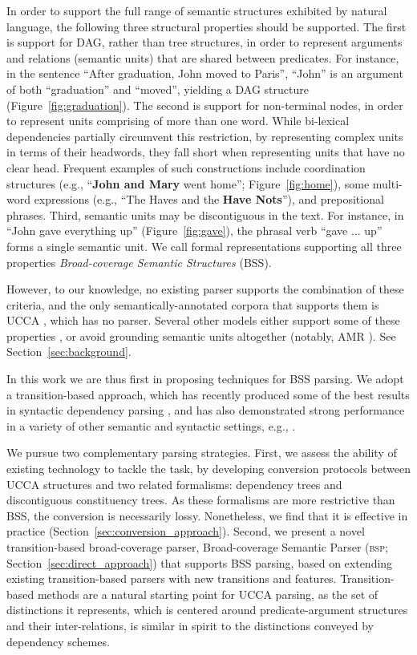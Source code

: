 \documentclass[11pt]{article}
\newcommand{\secref}[1]{Section~\ref{#1}}
\newcommand{\figref}[1]{Figure~\ref{#1}}
\begin{document}
In order to support the full range of semantic structures exhibited by
natural language, the following three structural properties should be supported.
The first is support for DAG, rather than tree structures,
in order to represent arguments and relations (semantic units)
that are shared between predicates.
For instance, in the sentence
``After graduation, John moved to Paris'', ``John'' is an argument of both ``graduation''
and ``moved'', yielding a DAG structure (\figref{fig:graduation}).
The second is support for non-terminal nodes, in order to represent units
comprising of more than one word.
While bi-lexical dependencies partially circumvent this restriction, by
representing complex units in terms of their headwords, they fall short
when representing units that have no clear head.
Frequent examples of such constructions include
coordination structures (e.g., ``{\bf John and Mary} went home''; \figref{fig:home}),
some multi-word expressions (e.g., ``The Haves and the {\bf Have Nots}''),
and prepositional phrases.
Third, semantic units may be discontiguous in the text. For instance, in ``John gave everything up''
(\figref{fig:gave}), the phrasal verb ``gave ... up'' forms a single semantic unit.
We call formal representations supporting all three properties
{\it Broad-coverage Semantic Structures} (BSS).

However, to our knowledge, no existing parser supports the combination of these criteria,
and the only semantically-annotated corpora that supports them is UCCA \cite{abend2013universal},
which has no parser.
Several other models either support some of these properties \cite{oepen2015semeval},
or avoid grounding semantic units altogether
(notably, AMR \cite{banarescu2013abstract}). See \secref{sec:background}.

In this work we are thus first in proposing techniques for BSS parsing.
We adopt a transition-based approach, which has recently produced some of the best
results in syntactic dependency parsing
\cite{dyer2015transition,ballesteros2015improved}, and has also demonstrated
strong performance in a variety of other semantic and syntactic settings,
e.g., .

We pursue two complementary parsing strategies.
First, we assess the ability of existing technology to tackle the task,
by developing conversion protocols between UCCA structures and two related formalisms:
dependency trees and discontiguous constituency trees.
As these formalisms are more restrictive than BSS, the conversion
is necessarily lossy. Nonetheless, we find that it is effective
in practice (\secref{sec:conversion_approach}).
Second, we present a novel transition-based broad-coverage parser,
Broad-coverage Semantic Parser (\textsc{bsp}; \secref{sec:direct_approach})
that supports BSS parsing, based on extending existing transition-based parsers
with new transitions and features. %
Transition-based methods are a natural starting point for UCCA parsing,
as the set of distinctions it represents, which is centered around predicate-argument
structures and their inter-relations, is similar in spirit to the distinctions
conveyed by dependency schemes.
\end{document}
